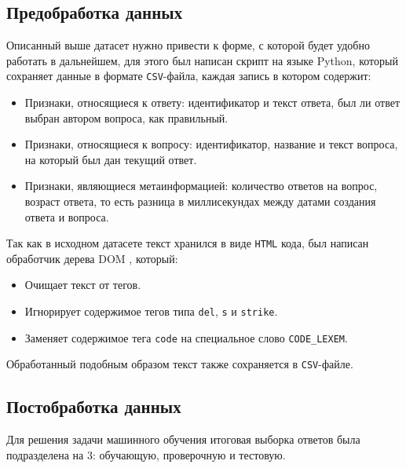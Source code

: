\documentclass[../diploma.tex]{subfiles}
\begin{document}
	\subsection{Предобработка данных}

	Описанный выше датасет нужно привести к форме, с которой будет удобно работать в дальнейшем, 
	для этого был написан скрипт на языке Python, который сохраняет данные в формате \texttt{CSV}-файла, каждая запись в котором содержит:
	
	\begin{itemize}

		\item
		Признаки, относящиеся к ответу: идентификатор и текст ответа, был ли ответ выбран автором вопроса, как правильный.

		\item
		Признаки, относящиеся к вопросу: идентификатор, название и текст вопроса, на который был дан текущий ответ.

	    \item
	    Признаки, являющиеся метаинформацией: количество ответов на вопрос, возраст ответа, то есть разница в миллисекундах между датами создания ответа и вопроса.

	\end{itemize}

	Так как в исходном датасете текст хранился в виде \texttt{HTML} кода, был написан обработчик дерева DOM \cite{online:dom}, который:
	\begin{itemize}
	
		\item
		Очищает текст от тегов.

		\item
		Игнорирует содержимое тегов типа \texttt{del}, \texttt{s} и \texttt{strike}.

		\item
		Заменяет содержимое тега \texttt{code} на специальное слово \texttt{CODE\_LEXEM}.
	
	\end{itemize}

	Обработанный подобным образом текст также сохраняется в \texttt{CSV}-файле.

	\subsection{Постобработка данных}

	Для решения задачи машинного обучения итоговая выборка ответов была подразделена на $3$: обучающую, проверочную и тестовую.
\end{document}
